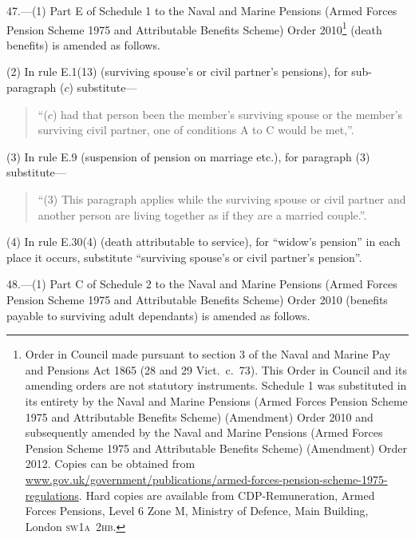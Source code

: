 \documentclass[12pt,a4paper]{article}
\begin{document}
47.—(1) Part E of Schedule 1 to the Naval and Marine Pensions (Armed Forces Pension Scheme 1975 and Attributable Benefits Scheme) Order 2010\footnote{\sloppy Order in Council made pursuant to section 3 of the Naval and Marine Pay and Pensions Act 1865 (28 and 29 Vict.\ c.~73). This Order in Council and its amending orders are not statutory instruments. Schedule 1 was substituted in its entirety by the Naval and Marine Pensions (Armed Forces Pension Scheme 1975 and Attributable Benefits Scheme) (Amendment) Order 2010 and subsequently amended by the Naval and Marine Pensions (Armed Forces Pension Scheme 1975 and Attributable Benefits Scheme) (Amendment) Order 2012. Copies can be obtained from
\href{http://www.gov.uk/government/publications/armed-forces-pension-scheme-1975-regulations}{www.gov.uk/\hspace{0pt}government/\hspace{0pt}publications/\hspace{0pt}armed-forces-pension-scheme-1975-regulations}. Hard copies are available from CDP-Remuneration, Armed Forces Pensions, Level 6 Zone M, Ministry of Defence, Main Building, London \textsc{\lowercase{SW1A~2HB}}.} (death benefits) is amended as follows.

(2) In rule E.1(13) (surviving spouse’s or civil partner’s pensions), for sub-paragraph ($c$)  substitute—
\begin{quotation}
“($c$) had that person been the member’s surviving spouse or the member’s surviving civil partner, one of conditions A to C would be met,”.
\end{quotation}

(3) In rule E.9 (suspension of pension on marriage etc.), for paragraph (3) substitute—
\begin{quotation}
“(3) This paragraph applies while the surviving spouse or civil partner and another person are living together as if they are a married couple.”.
\end{quotation}

(4) In rule E.30(4) (death attributable to service), for “widow’s pension” in each place it occurs, substitute “surviving spouse’s or civil partner’s pension”.

\medskip

48.—(1) Part C of Schedule 2 to the Naval and Marine Pensions (Armed Forces Pension Scheme 1975 and Attributable Benefits Scheme) Order 2010 (benefits payable to surviving adult dependants) is amended as follows.
\end{document}
